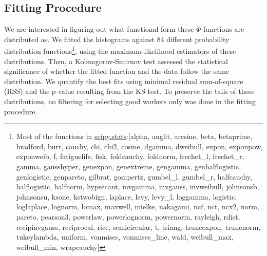 \documentclass[12pt]{article}
\begin{document}
\subsection{Fitting Procedure}
We are interested in figuring out what functional form these $\Phi$ functions are distributed as. We fitted the histograms against 84 different probability distribution functions\footnote{Most of the functions in  \href{https://docs.scipy.org/doc/scipy/reference/stats.html}{scipy.stats}:\tiny{[alpha, anglit, arcsine, beta, betaprime, bradford, burr, cauchy, chi, chi2, cosine, dgamma, dweibull, expon, exponpow, exponweib, f, fatiguelife, fisk, foldcauchy, foldnorm, frechet\_l, frechet\_r, gamma, gausshyper, genexpon, genextreme, gengamma, genhalflogistic, genlogistic, genpareto, gilbrat, gompertz, gumbel\_l, gumbel\_r, halfcauchy, halflogistic, halfnorm, hypsecant, invgamma, invgauss, invweibull, johnsonsb, johnsonsu, ksone, kstwobign, laplace, levy, levy\_l, loggamma, logistic, loglaplace, lognorm, lomax, maxwell, mielke, nakagami, ncf, nct, ncx2, norm, pareto, pearson3, powerlaw, powerlognorm, powernorm, rayleigh, rdist, recipinvgauss, reciprocal, rice, semicircular, t, triang, truncexpon, truncnorm, tukeylambda, uniform, vonmises, vonmises\_line, wald, weibull\_max, weibull\_min, wrapcauchy]}}, using the maximum-likelihood estimators of these distributions. Then, a  Kolmogorov-Smirnov test  assessed the statistical significance of whether the fitted function and the data follow the same distribution. We quantify the best fits using minimal residual sum-of-square (RSS) and the p-value resulting from the KS-test.  To preserve the tails of these distributions, no filtering for selecting good workers only was done in the fitting procedure. 
\end{document}

